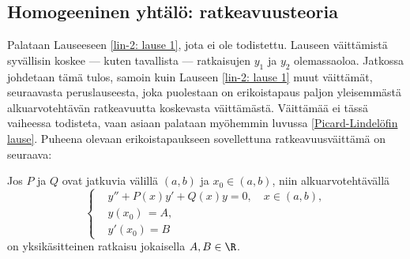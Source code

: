 \subsection{Homogeeninen yhtälö: ratkeavuusteoria}

Palataan Lauseeseen \ref{lin-2: lause 1}, jota ei ole todistettu. Lauseen väittämistä
syvällisin koskee --- kuten tavallista --- ratkaisujen $y_1$ ja $y_2$ olemassaoloa. Jatkossa
johdetaan tämä tulos, samoin kuin Lauseen  \ref{lin-2: lause 1} muut väittämät, seuraavasta
peruslauseesta, joka puolestaan on erikoistapaus paljon yleisemmästä alkuarvotehtävän
ratkeavuutta koskevasta väittämästä. Väittämää ei tässä vaiheessa todisteta, vaan asiaan
palataan myöhemmin luvussa \ref{Picard-Lindelöfin lause}. Puheena olevaan erikoistapaukseen
sovellettuna ratkeavuusväittämä on seuraava: 
\begin{*Lause} \label{lin-2: lause 2}  
Jos $P$ ja $Q$ ovat jatkuvia välillä $(a,b)$ ja $x_0\in (a,b)$, niin alkuarvotehtävällä
\[
\left\{ \begin{aligned}
&y''+P(x)y'+Q(x)y=0,\quad x\in (a,b), \\
&y(x_0)\,=A, \\
&y'(x_0) =B
\end{aligned} \right.
\]
on yksikäsitteinen ratkaisu jokaisella $A,B\in\R$.
\end{*Lause}


